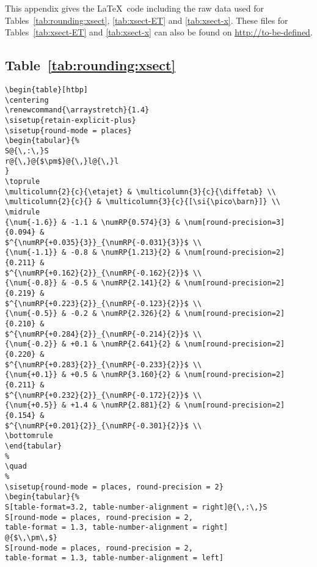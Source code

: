 \documentclass[UKenglish]{../../latex/atlasdoc}
\begin{document}
This appendix gives the \LaTeX\ code including the raw data used for 
Tables~\ref{tab:rounding:xsect}, 
\ref{tab:xsect-ET} and \ref{tab:xsect-x}.
These files for Tables~\ref{tab:xsect-ET} and \ref{tab:xsect-x} can also be 
found on \url{http://to-be-defined}.

\subsection{Table~\protect\ref{tab:rounding:xsect}}
\begin{verbatim}
\begin{table}[htbp]
\centering
\renewcommand{\arraystretch}{1.4}
\sisetup{retain-explicit-plus}
\sisetup{round-mode = places}
\begin{tabular}{%
S@{\,:\,}S
r@{\,}@{$\pm$}@{\,}l@{\,}l
}
\toprule
\multicolumn{2}{c}{\etajet} & \multicolumn{3}{c}{\diffetab} \\
\multicolumn{2}{c}{} & \multicolumn{3}{c}{[\si{\pico\barn}]} \\
\midrule
{\num{-1.6}} & -1.1 & \numRP{0.574}{3} & \num[round-precision=3]{0.094} & 
$^{\numRP{+0.035}{3}}_{\numRP{-0.031}{3}}$ \\
{\num{-1.1}} & -0.8 & \numRP{1.213}{2} & \num[round-precision=2]{0.211} & 
$^{\numRP{+0.162}{2}}_{\numRP{-0.162}{2}}$ \\
{\num{-0.8}} & -0.5 & \numRP{2.141}{2} & \num[round-precision=2]{0.219} & 
$^{\numRP{+0.223}{2}}_{\numRP{-0.123}{2}}$ \\
{\num{-0.5}} & -0.2 & \numRP{2.326}{2} & \num[round-precision=2]{0.210} & 
$^{\numRP{+0.284}{2}}_{\numRP{-0.214}{2}}$ \\
{\num{-0.2}} & +0.1 & \numRP{2.641}{2} & \num[round-precision=2]{0.220} & 
$^{\numRP{+0.283}{2}}_{\numRP{-0.233}{2}}$ \\
{\num{+0.1}} & +0.5 & \numRP{3.160}{2} & \num[round-precision=2]{0.211} & 
$^{\numRP{+0.232}{2}}_{\numRP{-0.172}{2}}$ \\
{\num{+0.5}} & +1.4 & \numRP{2.881}{2} & \num[round-precision=2]{0.154} & 
$^{\numRP{+0.201}{2}}_{\numRP{-0.301}{2}}$ \\
\bottomrule
\end{tabular}
%
\quad
%
\sisetup{round-mode = places, round-precision = 2}
\begin{tabular}{%
S[table-format=3.2, table-number-alignment = right]@{\,:\,}S
S[round-mode = places, round-precision = 2,
table-format = 1.3, table-number-alignment = right]
@{$\,\pm\,$}
S[round-mode = places, round-precision = 2,
table-format = 1.3, table-number-alignment = left]

\end{verbatim}
\end{document}
